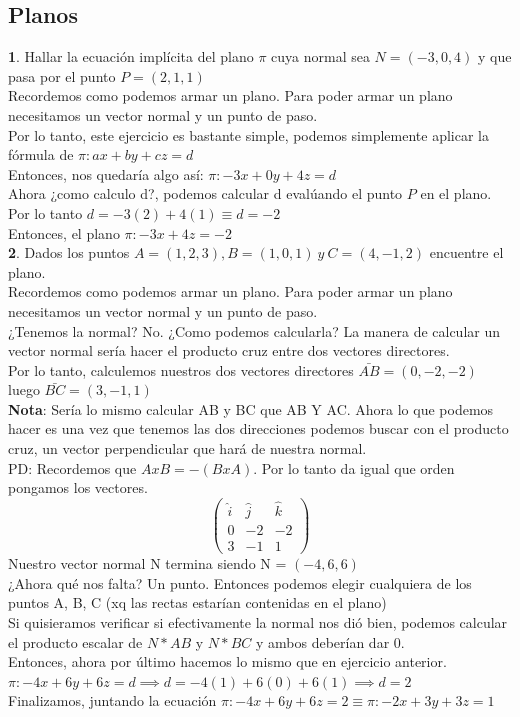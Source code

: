 \documentclass[10pt,a4paper]{article}
\begin{document}
\subsection*{Planos}
\label{subsec:ejercicios_planos}
\textbf{1}. Hallar la ecuación implícita del plano $\pi$ cuya normal sea $N=(-3, 0, 4)$ y que pasa por el punto $P=(2, 1, 1)$ \\
Recordemos como podemos armar un plano. Para poder armar un plano necesitamos un vector normal y un punto de paso. \\
Por lo tanto, este ejercicio es bastante simple, podemos simplemente aplicar la fórmula de $\pi:ax+by+cz = d$ \\
Entonces, nos quedaría algo así: $ \pi:-3x + 0y + 4z = d$ \\
Ahora ¿como calculo d?, podemos calcular d evalúando el punto $P$ en el plano. \\
Por lo tanto $d=-3(2) + 4(1) \equiv d = -2$ \\
Entonces, el plano $\pi:-3x+4z=-2$ \\

\textbf{2}. Dados los puntos $A=(1, 2, 3), B=(1,0,1) \ y \ C=(4, -1, 2)$ encuentre el plano. \\
Recordemos como podemos armar un plano. Para poder armar un plano necesitamos un vector normal y un punto de paso. \\
¿Tenemos la normal? No. ¿Como podemos calcularla? La manera de calcular un vector normal sería hacer el producto cruz entre dos vectores directores. \\
Por lo tanto, calculemos nuestros dos vectores directores $ \bar{AB} = (0, -2, -2)$ luego $\bar{BC} = (3, -1, 1)$ \\
\textbf{Nota}: Sería lo mismo calcular AB y BC que AB Y AC.
Ahora lo que podemos hacer es una vez que tenemos las dos direcciones podemos buscar con el producto cruz, un vector perpendicular que hará de nuestra normal. \\
PD: Recordemos que $A x B = - (B x A)$. Por lo tanto da igual que orden pongamos los vectores.
\[
\begin{pmatrix}
\hat{i} & \hat{j} & \hat{k} \\
0 & -2 & -2\\
3 & -1 & 1
\end{pmatrix}
\]
Nuestro vector normal N termina siendo N = $(-4, 6, 6)$ \\
¿Ahora qué nos falta? Un punto. Entonces podemos elegir cualquiera de los puntos A, B, C (xq las rectas estarían contenidas en el plano) \\
Si quisieramos verificar si efectivamente la normal nos dió bien, podemos calcular el producto escalar de $N * AB$ y $N * BC$ y ambos deberían dar 0. \\
Entonces, ahora por último hacemos lo mismo que en ejercicio anterior. $\pi:-4x+6y+6z=d \implies d=-4(1)+6(0)+6(1) \implies d = 2$ \\
Finalizamos, juntando la ecuación $\pi:-4x+6y+6z=2 \equiv \pi:-2x+3y+3z=1$ 
\end{document}
